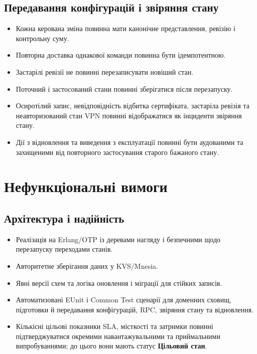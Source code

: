 \documentclass{article}
\begin{document}
\subsection{Передавання конфігурацій і звіряння стану}
\begin{itemize}
  \item Кожна керована зміна повинна мати канонічне представлення, ревізію і контрольну суму.
  \item Повторна доставка однакової команди повинна бути ідемпотентною.
  \item Застарілі ревізії не повинні перезаписувати новіший стан.
  \item Поточний і застосований стани повинні зберігатися після перезапуску.
  \item Осиротілий запис, невідповідність відбитка сертифіката, застаріла ревізія та неавторизований стан VPN повинні відображатися як інциденти звіряння стану.
  \item Дії з відновлення та виведення з експлуатації повинні бути аудованими та захищеними від повторного застосування старого бажаного стану.
\end{itemize}

\section{Нефункціональні вимоги}
\subsection{Архітектура і надійність}
\begin{itemize}
  \item Реалізація на Erlang/OTP із деревами нагляду і безпечними щодо перезапуску переходами станів.
  \item Авторитетне зберігання даних у KVS/Mnesia.
  \item Явні версії схем та логіка оновлення і міграції для стійких записів.
  \item Автоматизовані EUnit і Common Test сценарії для доменних сховищ, підготовки й передавання конфігурацій, RPC, звіряння стану та відновлення.
  \item Кількісні цільові показники SLA, місткості та затримки повинні підтверджуватися окремими навантажувальними та приймальними випробуваннями; до цього вони мають статус \textbf{Цільовий стан}.
\end{itemize}
\end{document}
